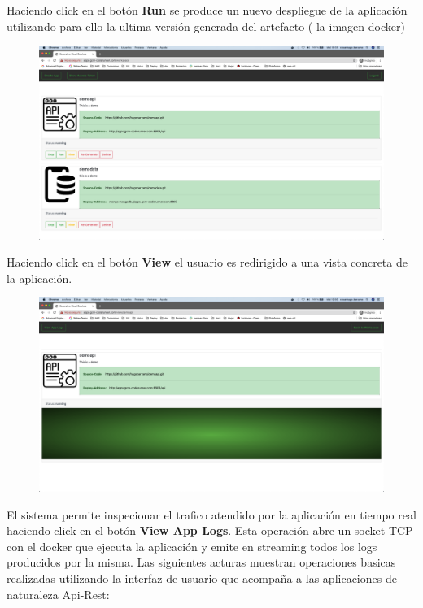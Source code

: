 \documentclass[a4paper,11pt]{book}
\begin{document}
Haciendo click en el botón \textbf{Run} se produce un nuevo despliegue de la aplicación utilizando para ello la ultima versión generada del artefacto ( la imagen docker) 


\begin{figure}[H]
\centering
\includegraphics[scale=0.2]{imagenes/casouso/1_4.png}
\caption{   }
\end{figure}


Haciendo click en el botón \textbf{View} el usuario es redirigido a una vista concreta de la aplicación. 

\begin{figure}[H]
\centering
\includegraphics[scale=0.2]{imagenes/casouso/1_5.png}
\caption{   }
\end{figure}

El sistema permite inspecionar el trafico atendido por la aplicación en tiempo real haciendo click en el botón \textbf{View App Logs}. Esta operación abre un socket TCP con el docker que ejecuta la aplicación y emite en streaming todos los logs producidos por la misma. Las siguientes acturas muestran operaciones basicas realizadas utilizando la interfaz de usuario que acompaña a las aplicaciones de naturaleza Api-Rest:
\end{document}
